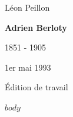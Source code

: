 \documentclass[11pt,a4paper]{report}
\providecommand{\releaseversion}{Édition de travail}
\begin{document}
\begin{titlepage}
\centering
\vspace*{1.8cm}
{\Large Léon Peillon\par}
\vspace{1.8cm}
{\Huge\bfseries Adrien Berloty\par}
\vspace{0.8cm}
{\LARGE 1851 - 1905\par}
\vfill
{\large 1er mai 1993\par}
\vspace{1cm}
{\small \releaseversion\par}
\end{titlepage}
\tableofcontents
\clearpage
$body$
\end{document}
